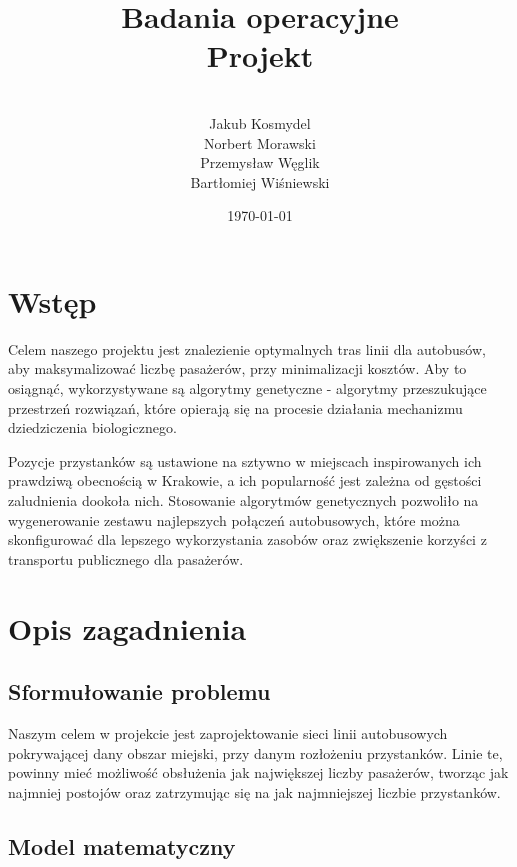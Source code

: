 \documentclass[12pt,a4paper]{article}
\begin{document}
\title{
    Badania operacyjne\\
    Projekt\\
}

\author{\\Jakub Kosmydel\\Norbert Morawski
    \\Przemysław Węglik\\Bartłomiej Wiśniewski}

\date{\today}

\maketitle
\newpage
\tableofcontents

\newpage

\section{Wstęp}
Celem naszego projektu jest znalezienie optymalnych tras linii dla autobusów, aby maksymalizować liczbę pasażerów, przy minimalizacji kosztów. Aby to osiągnąć, wykorzystywane są algorytmy genetyczne -  algorytmy przeszukujące przestrzeń rozwiązań, które opierają się na procesie działania mechanizmu dziedziczenia biologicznego.


Pozycje przystanków są ustawione na sztywno w miejscach inspirowanych ich prawdziwą obecnością w Krakowie, a ich popularność jest zależna od gęstości zaludnienia dookoła nich. Stosowanie algorytmów genetycznych pozwoliło na wygenerowanie zestawu najlepszych połączeń autobusowych, które można skonfigurować dla lepszego wykorzystania zasobów oraz zwiększenie korzyści z transportu publicznego dla pasażerów.

\section{Opis zagadnienia}

\subsection{Sformułowanie problemu}
Naszym celem w projekcie jest zaprojektowanie sieci linii autobusowych pokrywającej dany obszar miejski, przy danym rozłożeniu przystanków. Linie te, powinny mieć możliwość obsłużenia jak największej liczby pasażerów, tworząc jak najmniej postojów oraz zatrzymując się na jak najmniejszej liczbie przystanków.

\subsection{Model matematyczny}
\end{document}
